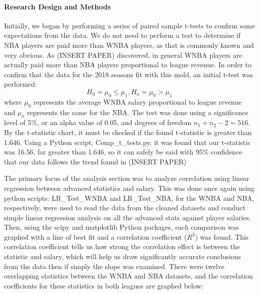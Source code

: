 \documentclass[12pt]{article}
\begin{document}
\paragraph{Research Design and Methods}
Initially, we began by performing a series of paired sample t-tests to confirm some expectations from the data. We do not need to perform a test to determine if NBA players are paid more than WNBA players, as that is commonly known and very obvious. As (INSERT PAPER) discovered, in general WNBA players are actually paid more than NBA players proportional to league revenue. In order to confirm that the data for the 2018 seasons fit with this mold, an initial t-test was performed:
$$H_0 = \mu_0 \leq \mu_1, H_a = \mu_0 > \mu_1$$
where $\mu_0$ represents the average WNBA salary proportional to league revenue and $\mu_a$ represents the same for the NBA. The test was done using a significance level of  5\%, or an alpha value of 0.05, and degrees of freedom $n_1 + n_2 - 2 = 516$. By the t-statistic chart, it must be checked if the found t-statistic is greater than 1.646. Using a Python script, Comp\_t\_tests.py, it was found that our t-statistic was 16.56, far greater than 1.646, so it can safely be said with 95\% confidence that our data follows the trend found in (INSERT PAPER)
\par
The primary focus of the analysis section was to analyze correlation using linear regression between advanced statistics and salary. This was done once again using python scripts: LR\_Test\_WNBA and LR\_Test\_NBA, for the WNBA and NBA, respectively, were used to read the data from the cleaned datasets and conduct simple linear regression analysis on all the advanced stats against player salaries. Then, using the scipy and matplotlib Python packages, each comparison was graphed with a line of best fit and a correlation coefficient ($R^2$) was found. This correlation coefficient tells us how strong the correlation effect is between the statistic and salary, which will help us draw significantly accurate conclusions from the data then if simply the slope was examined. There were twelve overlapping statistics between the WNBA and NBA datasets, and the correlation coefficients for these statistics in both leagues are graphed below:
\end{document}
